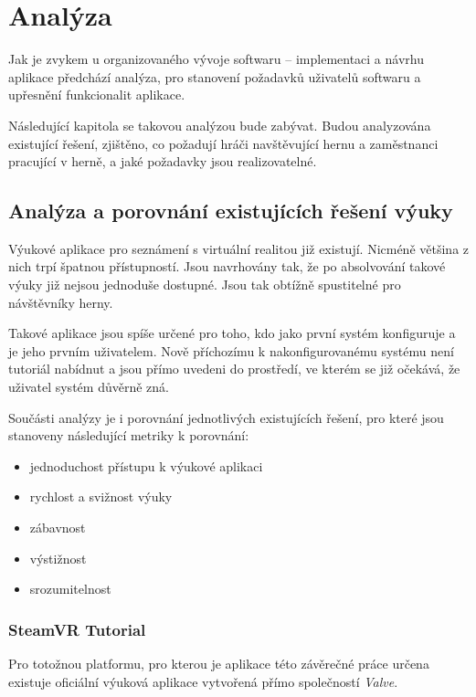 \chapter{Analýza}\label{analuxfdza}

Jak je zvykem u organizovaného vývoje softwaru -- implementaci a návrhu
aplikace předchází analýza, pro stanovení požadavků uživatelů softwaru a
upřesnění funkcionalit aplikace.

Následující kapitola se takovou analýzou bude zabývat. Budou analyzována
existující řešení, zjištěno, co požadují hráči navštěvující hernu a
zaměstnanci pracující v herně, a jaké požadavky jsou realizovatelné.

\section{Analýza a porovnání existujících řešení
výuky}\label{analuxfdza-a-porovnuxe1nuxed-existujuxedcuxedch-ux159eux161enuxed-vuxfduky}

Výukové aplikace pro seznámení s virtuální realitou již existují.
Nicméně většina z nich trpí špatnou přístupností. Jsou navrhovány tak,
že po absolvování takové výuky již nejsou jednoduše dostupné. Jsou tak
obtížně spustitelné pro návštěvníky herny.

Takové aplikace jsou spíše určené pro toho, kdo jako první systém
konfiguruje a je jeho prvním uživatelem. Nově příchozímu k
nakonfigurovanému systému není tutoriál nabídnut a jsou přímo uvedeni do
prostředí, ve kterém se již očekává, že uživatel systém důvěrně zná.

Součásti analýzy je i porovnání jednotlivých existujících řešení, pro
které jsou stanoveny následující metriky k porovnání:

\begin{itemize}
\tightlist
\item
  jednoduchost přístupu k výukové aplikaci
\item
  rychlost a svižnost výuky
\item
  zábavnost
\item
  výstižnost
\item
  srozumitelnost
\end{itemize}

\subsection{SteamVR Tutorial}\label{steamvr-tutorial}

Pro totožnou platformu, pro kterou je aplikace této závěrečné práce
určena existuje oficiální výuková aplikace vytvořená přímo společností
\emph{Valve}.

